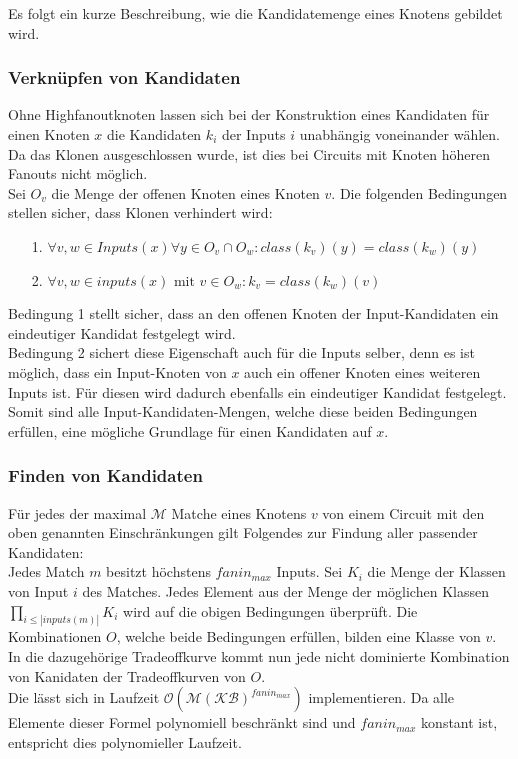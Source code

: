 \documentclass[11pt, a4paper, german]{article}
\begin{document}
Es folgt ein kurze Beschreibung, wie die Kandidatemenge eines Knotens gebildet wird.

\subsubsection{Verknüpfen von Kandidaten}
\label{subsubsec:verknuepfen_kandidaten}
Ohne Highfanoutknoten lassen sich bei der Konstruktion eines Kandidaten für einen Knoten $x$ die Kandidaten $k_i$ der Inputs $i$ unabhängig voneinander wählen.
Da das Klonen ausgeschlossen wurde, ist dies bei Circuits mit Knoten höheren Fanouts nicht möglich.\\
Sei $O_v$ die Menge der offenen Knoten eines Knoten $v$.
Die folgenden Bedingungen stellen sicher, dass Klonen verhindert wird: \\
\begin{itemize}
	\item[1.] $\forall v,w \in Inputs(x) \forall y \in O_v \cap O_w : class(k_v)(y) = class(k_w)(y)$
	\item[2.] $\forall v,w \in inputs(x) \text{ mit } v \in O_w : k_v = class(k_w)(v)$
\end{itemize}
Bedingung 1 stellt sicher, dass an den offenen Knoten der Input-Kandidaten ein eindeutiger Kandidat festgelegt wird.\\ Bedingung 2 sichert diese Eigenschaft auch für die Inputs selber, denn es ist möglich, dass ein Input-Knoten von $x$ auch ein offener Knoten eines weiteren Inputs ist. Für diesen wird dadurch ebenfalls ein eindeutiger Kandidat festgelegt. \\
Somit sind alle Input-Kandidaten-Mengen, welche diese beiden Bedingungen erfüllen, eine mögliche Grundlage für einen Kandidaten auf $x$. 

\subsubsection{Finden von Kandidaten} 
Für jedes der maximal $\mathcal{M}$ Matche eines Knotens $v$ von einem Circuit mit den oben genannten Einschränkungen gilt Folgendes zur Findung aller passender Kandidaten:\\

Jedes Match $m$ besitzt höchstens $fanin_{max}$ Inputs. Sei $K_i$ die Menge der Klassen von Input $i$ des Matches. Jedes Element aus der Menge der möglichen Klassen $\prod_{i\leq |inputs(m)|} K_i $ wird auf die obigen Bedingungen überprüft. Die Kombinationen $O$, welche beide Bedingungen erfüllen, bilden eine Klasse von $v$. In die  dazugehörige Tradeoffkurve kommt nun jede nicht dominierte Kombination von Kanidaten der Tradeoffkurven von $O$. \\
Die lässt sich in Laufzeit $\mathcal{O}(\mathcal{M}(\mathcal{KB})^{fanin_{max}} )$ implementieren. Da alle Elemente dieser Formel polynomiell beschränkt sind und $fanin_{max}$ konstant ist, entspricht dies polynomieller Laufzeit.
 
\end{document}
